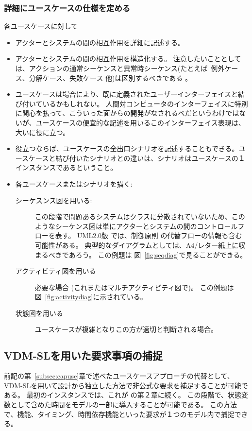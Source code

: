 \documentclass[\pformat,12pt]{jreport}
\begin{document}
\subsubsection{詳細にユースケースの仕様を定める}

各ユースケースに対して

\begin{itemize}
\item アクターとシステムの間の相互作用を詳細に記述する。
\item アクターとシステムの間の相互作用を構造化する。
注意したいこととしては、アクションの通常シーケンスと異常時シーケンス(たとえば\ 例外ケース、分解ケース、失敗ケース 他)は区別するべきである 。
\item ユースケースは場合により、既に定義されたユーザーインターフェイスと結び付いているかもしれない。
人間対コンピュータのインターフェイスに特別に関心を払って、こういった面からの開発がなされるべだというわけではないが、ユースケースの便宜的な記述を用いるこのインターフェイス表現は、大いに役に立つ。
\item 役立つならば、ユースケースの全出口シナリオを記述することもできる。ユースケースと結び付いたシナリオとの違いは、シナリオはユースケースの１インスタンスであるということ。
\item 各ユースケースまたはシナリオを描く:
\begin{description}
\item[シーケスンス図を用いる:] この段階で問題あるシステムはクラスに分散されていないため、このようなシーケンス図は単にアクターとシステムの間のコントロールフローを表す。
UML2.0版 では、制御原則 \cite{UML20}の代替フローの情報も含む可能性がある。
典型的なダイアグラムとしては、A4/レター紙上に収まるべきであろう。
この例題は 図~\ref{fig:seqdiag}で見ることができる。
\item[アクティビティ図を用いる] 必要な場合 (これまたはマルチアクティビティ図で)。 この例題は図~\ref{fig:activitydiag}に示されている。
\item[状態図を用いる] ユースケースが複雑となりこの方が適切と判断される場合。
\end{description}
\end{itemize}

\subsection{VDM-SLを用いた要求事項の捕捉}\label{subsec:captureVDM}
\label{subsec:VDMSL}

前記の第~\ref{subsec:capuse}章で述べたユースケースアプローチの代替として、VDM-SLを用いて設計から独立した方法で非公式な要求を補足することが可能である。
最初のインスタンスでは、これが \cite{Fitzgerald&98b,Fitzgerald&05}の第２章に続く。
この段階で、状態変数として含めた時間をモデルの一部に導入することが可能である。
この方法で、機能、タイミング、時間依存機能といった要求が１つのモデル内で捕捉できる。
\end{document}
